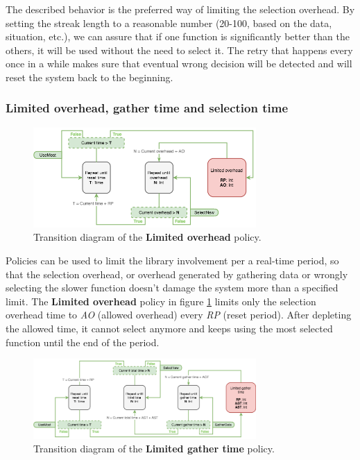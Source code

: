 The described behavior is the preferred way of limiting the selection overhead. By setting the streak length to a reasonable number (20-100, based on the data, situation, etc.), we can assure that if one function is significantly better than the others, it will be used without the need to select it. The retry that happens every once in a while makes sure that eventual wrong decision will be detected and will reset the system back to the beginning.

\subsubsection{Limited overhead, gather time and selection time}

\begin{figure}[h!]
	\captionsetup{justification=centering,margin=0.5cm}
	\centerline{\mbox{\includegraphics[width=85mm]{./img/limited_overhead.png}}}
	\caption{Transition diagram of the \textbf{Limited overhead} policy.}
	\label{fig:limited_overhead}
\end{figure}

Policies can be used to limit the library involvement per a real-time period, so that the selection overhead, or overhead generated by gathering data or wrongly selecting the slower function doesn't damage the system more than a specified limit. The \textbf{Limited overhead} policy in figure \ref{fig:limited_overhead} limits only the selection overhead time to \textit{AO} (allowed overhead) every \textit{RP} (reset period). After depleting the allowed time, it cannot select anymore and keeps using the most selected function until the end of the period.

\begin{figure}[h!]
	\captionsetup{justification=centering,margin=0.5cm}
	\centerline{\mbox{\includegraphics[width=85mm]{./img/limited_gather_time.png}}}
	\caption{Transition diagram of the \textbf{Limited gather time} policy.}
	\label{fig:limited_gather_time}
\end{figure}

